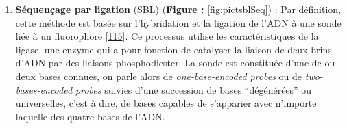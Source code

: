 \documentclass[12pt,a4paper,twoside]{ugathesis}
\providecommand{\tightlist}{%
  \setlength{\itemsep}{0pt}\setlength{\parskip}{0pt}}
\theoremstyle{definition}
\theoremstyle{definition}
\theoremstyle{definition}
\theoremstyle{remark}
\begin{document}
\newpage

\begin{enumerate}
\def\labelenumi{\arabic{enumi}.}
\setcounter{enumi}{1}
\tightlist
\item
  \textbf{Séquençage par ligation} (SBL) (\textbf{Figure :
  }\ref{fig:pictsblSeq}) : Par définition, cette méthode est basée sur
  l'hybridation et la ligation de l'ADN à une sonde liée à un
  fluorophore {[}\protect\hyperlink{ref-Tomkinson2006}{115}{]}. Ce
  processus utilise les caractéristiques de la ligase, une enzyme qui a
  pour fonction de catalyser la liaison de deux brins d'ADN par des
  liaisons phosphodiester. La sonde est constituée d'une de ou deux
  bases connues, on parle alors de \emph{one-base-encoded probes} ou de
  \emph{two-bases-encoded probes} suivies d'une succession de bases
  ``dégénérées'' ou universelles, c'est à dire, de bases capables de
  s'apparier avec n'importe laquelle des quatre bases de l'ADN.
\end{enumerate}
\end{document}
